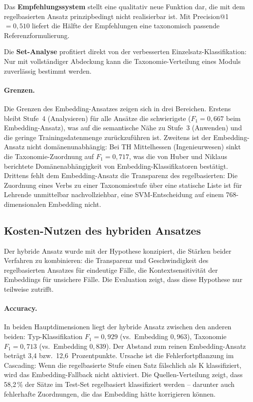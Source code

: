 Das \textbf{Empfehlungssystem} stellt eine qualitativ neue Funktion dar, die mit dem regelbasierten Ansatz prinzipbedingt nicht realisierbar ist.
Mit Precision@1 $= 0{,}510$ liefert die Hälfte der Empfehlungen eine taxonomisch passende Referenzformulierung.

Die \textbf{Set-Analyse} profitiert direkt von der verbesserten Einzelsatz-Klassifikation: Nur mit vollständiger Abdeckung kann die Taxonomie-Verteilung eines Moduls zuverlässig bestimmt werden.

\paragraph{Grenzen.}
Die Grenzen des Embedding-Ansatzes zeigen sich in drei Bereichen.
Erstens bleibt Stufe~4 (Analysieren) für alle Ansätze die schwierigste ($F_1 = 0{,}667$ beim Embedding-Ansatz), was auf die semantische Nähe zu Stufe~3 (Anwenden) und die geringe Trainingsdatenmenge zurückzuführen ist.
Zweitens ist der Embedding-Ansatz nicht domänenunabhängig: Bei TH Mittelhessen (Ingenieurwesen) sinkt die Taxonomie-Zuordnung auf $F_1 = 0{,}717$, was die von Huber und Niklaus~\cite{huber2025llmsblooms} berichtete Domänenabhängigkeit von Embedding-Klassifikatoren bestätigt.
Drittens fehlt dem Embedding-Ansatz die Transparenz des regelbasierten: Die Zuordnung eines Verbs zu einer Taxonomiestufe über eine statische Liste ist für Lehrende unmittelbar nachvollziehbar, eine SVM-Entscheidung auf einem 768-dimensionalen Embedding nicht.

\subsection{Kosten-Nutzen des hybriden Ansatzes}\label{sec:kosten-nutzen}

Der hybride Ansatz wurde mit der Hypothese konzipiert, die Stärken beider Verfahren zu kombinieren: die Transparenz und Geschwindigkeit des regelbasierten Ansatzes für eindeutige Fälle, die Kontextsensitivität der Embeddings für unsichere Fälle.
Die Evaluation zeigt, dass diese Hypothese nur teilweise zutrifft.

\paragraph{Accuracy.}
In beiden Hauptdimensionen liegt der hybride Ansatz zwischen den anderen beiden: Typ-Klassifikation $F_1 = 0{,}929$ (vs.\ Embedding $0{,}963$), Taxonomie $F_1 = 0{,}713$ (vs.\ Embedding $0{,}839$).
Der Abstand zum reinen Embedding-Ansatz beträgt 3{,}4 bzw.\ 12{,}6~Prozentpunkte.
Ursache ist die Fehlerfortpflanzung im Cascading: Wenn die regelbasierte Stufe einen Satz fälschlich als K klassifiziert, wird das Embedding-Fallback nicht aktiviert.
Die Quellen-Verteilung zeigt, dass 58{,}2\,\% der Sätze im Test-Set regelbasiert klassifiziert werden -- darunter auch fehlerhafte Zuordnungen, die das Embedding hätte korrigieren können.

